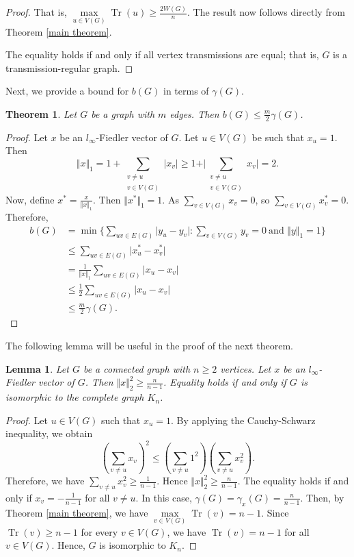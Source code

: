 \documentclass[12pt]{article}
\newtheorem{theorem}{Theorem}[section]
\newtheorem{lemma}{Lemma}[section]
\DeclareMathOperator{\tr}{Tr}
\begin{document}
{{\begin{proof}
				That is,  $\max\limits_{u \in V(G)}\tr(u) \geq \frac{2W(G)}{n}$. The result now follows directly from Theorem \ref{main theorem}.
				
				The equality holds if and only if all vertex transmissions are equal; that is, $G$ is a transmission-regular graph.
			\end{proof}
			
			Next, we provide a bound for $b(G)$ in terms of $\gamma (G)$.  
			\begin{theorem}
				Let $G$ be a graph with $m$ edges. Then $b(G) \leq \frac{m}{2}\gamma(G)$.
			\end{theorem}
			\begin{proof}
				Let $x$ be an $l_{\infty}$-Fiedler vector of $G$. Let $u \in V(G)$ be such that $x_u=1$. Then
				$$
				\Vert x \Vert_1=1+\sum_{\substack{v \neq u \\ v\in V(G)}}\vert x_v\vert \geq 1+ \vert \sum_{\substack{v \neq u \\ v\in V(G)}}  x_v \vert=2.
				$$
				Now, define $x^{*} = \frac{x}{\Vert x \Vert _1}$. Then $\Vert x^*\Vert _1=1$. As $\sum\limits_{v \in V(G)}x_v=0$, so $ \sum\limits_{v \in V(G)}x^{*}_v=0$. Therefore,
				\begin{align*}
					b(G)&=\min\biggl\{\sum_{uv \in E(G)}\vert y_u - y_v \vert: \sum_{v \in V(G)} y_v =0 ~\mbox{{and}~} \Vert y \Vert_1=1\biggl\}\\
					&\leq \sum\limits_{uv \in E(G)}\vert x^*_u - x^*_v \vert \\
					&=\frac{1}{\Vert x \Vert_1}\sum_{uv \in E(G)} \vert x_u - x_v \vert\\
					&\leq \frac{1}{2}\sum_{uv \in E(G)}\vert x_u - x_v \vert \\
					&\leq \frac{m}{2}\gamma(G).
				\end{align*} 
			\end{proof}
			The following lemma will be useful in the proof of the next theorem. 
			\begin{lemma}\label{norm-2-bound}
				Let $G$ be a connected graph with $n \geq 2$ vertices. Let $x$ be an $l_\infty$-Fiedler vector of $G$. Then $\Vert x \Vert^2 _{2} \geq \frac{n}{n-1}$. Equality holds if and only if $G$ is isomorphic to the complete graph $K_n$.
			\end{lemma}
			\begin{proof}
				Let $u \in V(G)$ such that $x_u=1$. By applying the Cauchy-Schwarz inequality, we obtain 
				$$
				(\sum_{v \neq u}x_v)^2 \leq (\sum_{v \neq u}1^2)(\sum_{v \neq u}x_v^2).
				$$
				Therefore, we have $\sum\limits_{v \neq u}x_v^2 \geq \frac{1}{n-1}$. Hence 
				$\Vert x \Vert^2 _{2} \geq \frac{n}{n-1}$. The equality holds if and only if $x_v=-\frac{1}{n-1}$ for all $v\neq u$. In this case, $\gamma(G)=\gamma_x(G)=\frac{n}{n-1}$. Then, by Theorem \ref{main theorem}, we have $\max\limits_{v \in V(G)}\tr(v)=n-1$. Since $\tr(v) \geq n-1$ for every $v \in V(G)$, we have $\tr(v) = n-1$ for all $v \in V(G)$. Hence, $G$ is isomorphic to $K_n$.
			\end{proof}
			
}}
\end{document}
